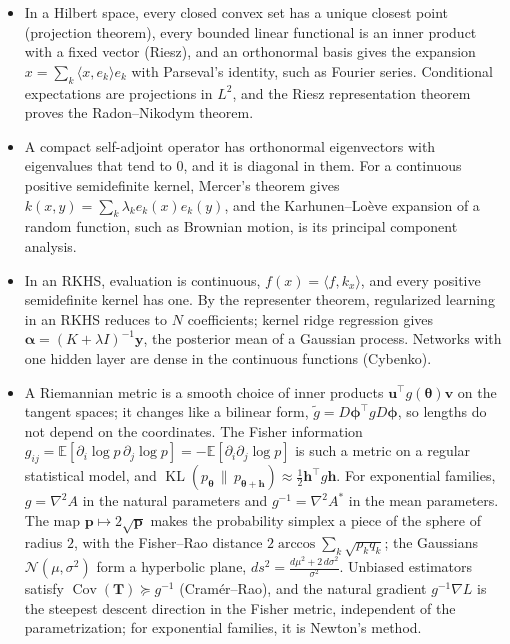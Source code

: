 \documentclass[11pt]{article}
\newcommand{\ip}[2]{\langle #1, #2 \rangle}
\newcommand{\E}{\mathbb{E}}
\theoremstyle{definition}
\theoremstyle{plain}
\theoremstyle{remark}
\DeclareMathOperator{\Cov}{Cov}
\DeclareMathOperator{\KL}{KL}
\begin{document}
\begin{itemize}[leftmargin=*]
    \item In a Hilbert space, every closed convex set has a unique closest point (projection theorem), every bounded linear functional is an inner product with a fixed vector (Riesz), and an orthonormal basis gives the expansion $x = \sum_k \ip{x}{e_k}e_k$ with Parseval's identity, such as Fourier series. Conditional expectations are projections in $L^2$, and the Riesz representation theorem proves the Radon--Nikodym theorem.
    \item A compact self-adjoint operator has orthonormal eigenvectors with eigenvalues that tend to $0$, and it is diagonal in them. For a continuous positive semidefinite kernel, Mercer's theorem gives $k(x, y) = \sum_k \lambda_ke_k(x)e_k(y)$, and the Karhunen--Lo\`eve expansion of a random function, such as Brownian motion, is its principal component analysis.
    \item In an RKHS, evaluation is continuous, $f(x) = \ip{f}{k_x}$, and every positive semidefinite kernel has one. By the representer theorem, regularized learning in an RKHS reduces to $N$ coefficients; kernel ridge regression gives $\boldsymbol{\alpha} = (K + \lambda I)^{-1}\mathbf{y}$, the posterior mean of a Gaussian process. Networks with one hidden layer are dense in the continuous functions (Cybenko).
    \item A Riemannian metric is a smooth choice of inner products $\mathbf{u}^\top g(\boldsymbol{\theta})\mathbf{v}$ on the tangent spaces; it changes like a bilinear form, $\tilde g = D\boldsymbol{\phi}^\top gD\boldsymbol{\phi}$, so lengths do not depend on the coordinates. The Fisher information $g_{ij} = \E[\partial_i\log p\,\partial_j\log p] = -\E[\partial_i\partial_j\log p]$ is such a metric on a regular statistical model, and $\KL(p_{\boldsymbol{\theta}} \,\|\, p_{\boldsymbol{\theta} + \mathbf{h}}) \approx \frac{1}{2}\mathbf{h}^\top g\mathbf{h}$. For exponential families, $g = \nabla^2A$ in the natural parameters and $g^{-1} = \nabla^2A^*$ in the mean parameters. The map $\mathbf{p} \mapsto 2\sqrt{\mathbf{p}}$ makes the probability simplex a piece of the sphere of radius $2$, with the Fisher--Rao distance $2\arccos\sum_k\sqrt{p_kq_k}$; the Gaussians $\mathcal{N}(\mu, \sigma^2)$ form a hyperbolic plane, $ds^2 = \frac{d\mu^2 + 2\,d\sigma^2}{\sigma^2}$. Unbiased estimators satisfy $\Cov(\mathbf{T}) \succeq g^{-1}$ (Cram\'er--Rao), and the natural gradient $g^{-1}\nabla L$ is the steepest descent direction in the Fisher metric, independent of the parametrization; for exponential families, it is Newton's method.
\end{itemize}
\end{document}
